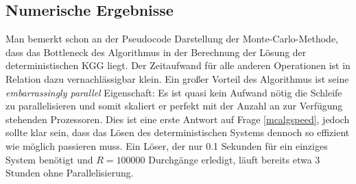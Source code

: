 \subsection{Numerische Ergebnisse}
Man bemerkt schon an der Pseudocode Darstellung der Monte-Carlo-Methode, dass das Bottleneck des Algorithmus in der Berechnung der Lösung der deterministischen KGG liegt. Der Zeitaufwand für alle anderen Operationen ist in Relation dazu vernachlässigbar klein. Ein großer Vorteil des Algorithmus ist seine \emph{embarrassingly parallel} Eigenschaft: Es ist quasi kein Aufwand nötig die Schleife zu parallelisieren und somit skaliert er perfekt mit der Anzahl an zur Verfügung stehenden Prozessoren. Dies ist eine erste Antwort auf Frage \ref{mcalgspeed}, jedoch sollte klar sein, dass das Lösen des deterministischen Systems dennoch so effizient wie möglich passieren muss. Ein Löser, der nur 0.1 Sekunden für ein einziges System benötigt und $R=100000$ Durchgänge erledigt, läuft bereits etwa 3 Stunden ohne Parallelisierung.\\
